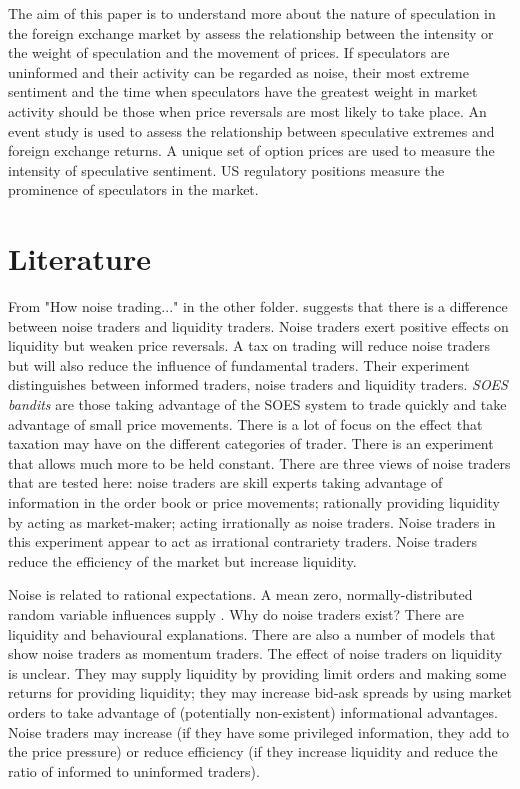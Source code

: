 \documentclass[12pt, a4paper, oneside]{article} %
\begin{document}
The aim of this paper is to understand more about the nature of speculation in the foreign exchange market by assess the relationship between the intensity or the weight of speculation and the movement of prices.  If speculators are uninformed and their activity can be regarded as noise, their most extreme sentiment and the time when speculators have the greatest weight in market activity should be those when price reversals are most likely to take place.  An event study is used to assess the relationship between speculative extremes and foreign exchange returns.  A unique set of option prices are used to measure the intensity of speculative sentiment.  US regulatory positions measure the prominence of speculators in the market.  

\section{Literature}
From "How noise trading..." in the other folder. 
\citet{bloomfield2009noise} suggests that there is a difference between noise traders and liquidity traders.  Noise traders exert positive effects on liquidity but weaken price reversals. A tax on trading will reduce noise traders but will also reduce the influence of fundamental traders. Their experiment distinguishes between informed traders, noise traders and liquidity traders.  \emph{SOES bandits} are those taking advantage of the SOES system to trade quickly and take advantage of small price movements. There is a lot of focus on the effect that taxation may have on the different categories of trader. There is an experiment that allows much more to be held constant. There are three views of noise traders that are tested here:  noise traders are skill experts taking advantage of information in the order book or price movements;  rationally providing liquidity by acting as market-maker; acting irrationally as noise traders. Noise traders in this experiment appear to act as irrational contrariety traders. Noise traders reduce the efficiency of the market but increase liquidity. 

Noise is related to rational expectations.  A mean zero, normally-distributed random variable influences supply \citet{Muth1961Rational}.  Why do noise traders exist?  There are liquidity and behavioural explanations. There are also a number of models that show noise traders as momentum traders. The effect of noise traders on liquidity is unclear. They may supply liquidity by providing limit orders and making some returns for providing liquidity; they may increase bid-ask spreads by using market orders to take advantage of (potentially non-existent) informational advantages. Noise traders may increase (if they have some privileged information, they add to the price pressure) or reduce efficiency (if they increase liquidity and reduce the ratio of informed to uninformed traders). 
\end{document}
